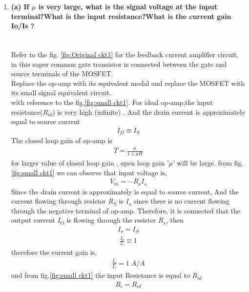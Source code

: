 \begin{enumerate}[label=\thesection.\arabic*.,ref=\thesection.\theenumi]
\item 
\label{Question_1a_ee18btech11023}
\textbf{
(a) If $\mu$ is very large, what is the signal voltage at the input
terminal?What is the input resistance?What is the current
gain Io/Is ?}\\
\\
\solution \\
Refer to the fig. \ref{fig:Original ckt1} for the feedback current amplifier circuit, in this super common gate transistor is connected between the gate and source terminals of the MOSFET.\\
Replace the op-amp with its equivalent modal and replace the MOSFET with its small signal equivalent circuit.\\
with reference to the fig,\ref{fig:small ckt1}. For ideal op-amp,the input resistance($R_{id}$) is very high (infinite) . And the drain current is approximately equal to source current
\begin{align}
    I_{D} \cong  I_{S}
\label{eq_ee18btech11023_1}
\end{align}
The closed loop gain of op-amp is
\begin{align}
    T = \frac{\mu}{1 + \mu H}
    \label{eq_ee18btech11023_2}
\end{align}
for larger value of closed loop gain , open loop gain '$\mu$' will be large. 
from fig.\ref{fig:small ckt1} we can observe that input voltage is,
\begin{align}
    V_{in} = -R_sI_s
    \label{eq_ee18btech11023_3}
\end{align}
Since the drain current is approximately is equal to source current, And the current flowing through resistor $R_S$ is $I_s$ since there is no current flowing through the negative terminal of  op-amp. Therefore, it is connected that the output current $I_O$ is flowing through the resister $R_s$, then
\begin{align}
    I_o = I_S
    \label{eq_ee18btech11023_4}
\end{align}
\begin{align*}
    \frac{I_o}{I_s} \equiv 1 
\end{align*}
therefore the current gain is,
\begin{align}
    \frac{I_o}{I_s} = 1 \; A/A
    \label{eq_ee18btech11023_5}
\end{align}
and from fig.\ref{fig:small ckt1} the input Resistance is equal to $R_{id}$
\begin{align}
    R_{i} = R_{id}
    \label{eq_ee18btech11023_6}
\end{align}


\end{enumerate}
